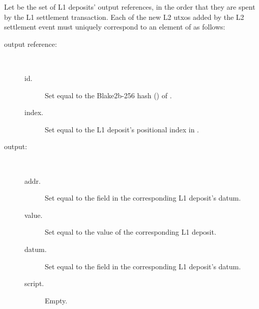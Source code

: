 \documentclass[../hydrozoa.tex]{subfiles}
\begin{document}
Let  be the set of L1 deposits' output references, in the order that they are spent by the L1 settlement transaction.
Each of the new L2 utxos added by the L2 settlement event must uniquely correspond to an element of  as follows:
\begin{description}
  \item[output reference:]~
    \begin{description}
      \item[id.] Set equal to the Blake2b-256 hash () of .
      \item[index.] Set equal to the L1 deposit's positional index in .
    \end{description}
  \item[output:]~
    \begin{description}
      \item[addr.] Set equal to the  field in the corresponding L1 deposit's datum.
      \item[value.] Set equal to the value of the corresponding L1 deposit.
      \item[datum.] Set equal to the  field in the corresponding L1 deposit's datum.
      \item[script.] Empty.
    \end{description}
  \end{description}
\end{document}
